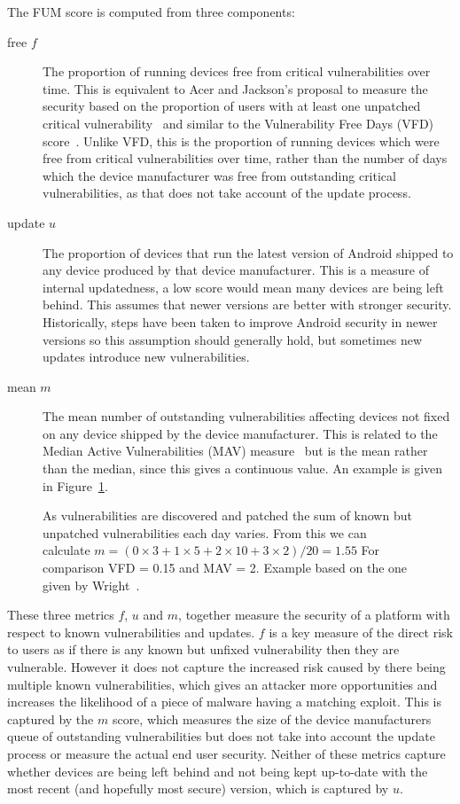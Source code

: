 The FUM score is computed from three components:
\begin{description}
  \item[free $f$] The proportion of running devices free from critical vulnerabilities over time.
  This is equivalent to Acer and Jackson's proposal to measure the security based on the proportion of users with at least one unpatched critical vulnerability~\cite{Acer2010} and similar to the Vulnerability Free Days (VFD) score~\cite{Wright2014}.
  Unlike VFD, this is the proportion of running devices which were free from critical vulnerabilities over time, rather than the number of days which the device manufacturer was free from outstanding critical vulnerabilities, as that does not take account of the update process.
  \item[update $u$] The proportion of devices that run the latest version of Android shipped to any device produced by that device manufacturer. This is a measure of internal updatedness, a low score would mean many devices are being left behind.
  This assumes that newer versions are better with stronger security.
  Historically, steps have been taken to improve Android security in newer versions so this assumption should generally hold, but sometimes new updates introduce new vulnerabilities.
  \item[mean $m$] The mean number of outstanding vulnerabilities affecting devices not fixed on any device shipped by the device manufacturer. This is related to the Median Active Vulnerabilities (MAV) measure~\cite{Wright2014} but is the mean rather than the median, since this gives a continuous value.
  An example is given in Figure~\ref{fig:mcalculation}.
\end{description}

\begin{figure}
\centering

\caption{As vulnerabilities are discovered and patched the sum of known but unpatched vulnerabilities each day varies. From this we can calculate $m = (0 \times 3 + 1 \times 5 + 2 \times 10 + 3 \times 2) / 20 = 1.55$ For comparison VFD = 0.15 and MAV = 2. Example based on the one given by Wright~\cite{Wright2014}.}
\label{fig:mcalculation}
\end{figure}

These three metrics $f$, $u$ and $m$, together measure the security of a platform with respect to known vulnerabilities and updates.
$f$ is a key measure of the direct risk to users as if there is any known but unfixed vulnerability then they are vulnerable.
However it does not capture the increased risk caused by there being multiple known vulnerabilities, which gives an attacker more opportunities and increases the likelihood of a piece of malware having a matching exploit.
This is captured by the $m$ score, which measures the size of the device manufacturers queue of outstanding vulnerabilities but does not take into account the update process or measure the actual end user security.
Neither of these metrics capture whether devices are being left behind and not being kept up-to-date with the most recent (and hopefully most secure) version, which is captured by $u$.

